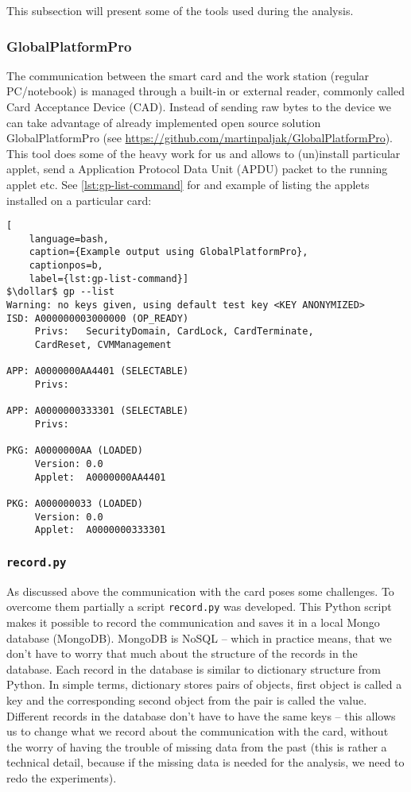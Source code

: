 \documentclass[a4paper]{scrartcl}
\newcommand{\dollar}{\mbox{\textdollar}}
\begin{document}
This subsection will present some of the tools used during the analysis.

\subsubsection{GlobalPlatformPro}

The communication between the smart card and the work station (regular PC/notebook) is managed through a built-in or external reader, commonly called Card Acceptance Device (CAD). Instead of sending raw bytes to the device we can take advantage of already implemented open source solution GlobalPlatformPro (see \url{https://github.com/martinpaljak/GlobalPlatformPro}). This tool does some of the heavy work for us and allows to (un)install particular applet, send a Application Protocol Data Unit (APDU) packet to the running applet etc. See \ref{lst:gp-list-command} for and example of listing the applets installed on a particular card:
\begin{lstlisting}[
    language=bash,
    caption={Example output using GlobalPlatformPro},
    captionpos=b,
    label={lst:gp-list-command}]
$\dollar$ gp --list
Warning: no keys given, using default test key <KEY ANONYMIZED>
ISD: A000000003000000 (OP_READY)
     Privs:   SecurityDomain, CardLock, CardTerminate,
     CardReset, CVMManagement

APP: A0000000AA4401 (SELECTABLE)
     Privs:

APP: A0000000333301 (SELECTABLE)
     Privs:

PKG: A0000000AA (LOADED)
     Version: 0.0
     Applet:  A0000000AA4401

PKG: A000000033 (LOADED)
     Version: 0.0
     Applet:  A0000000333301
\end{lstlisting}

\subsubsection{\texttt{record.py}}

As discussed above the communication with the card poses some challenges. To overcome them partially a script \texttt{record.py} was developed. This Python script makes it possible to record the communication and saves it in a local Mongo database (MongoDB). MongoDB is NoSQL -- which in practice means, that we don't have to worry that much about the structure of the records in the database. Each record in the database is similar to dictionary structure from Python. In simple terms, dictionary stores pairs of objects, first object is called a key and the corresponding second object from the pair is called the value. Different records in the database don't have to have the same keys -- this allows us to change what we record about the communication with the card, without the worry of having the trouble of missing data from the past (this is rather a technical detail, because if the missing data is needed for the analysis, we need to redo the experiments).
\end{document}
